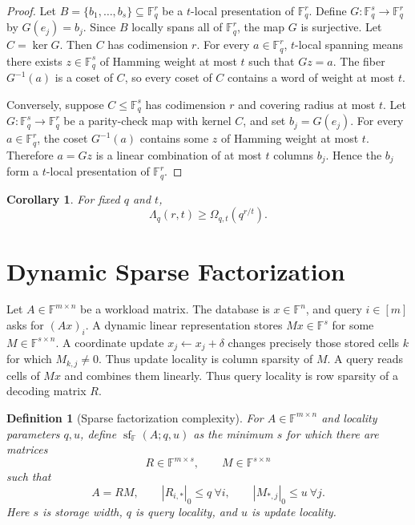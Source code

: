 \documentclass[11pt]{article}
\newtheorem{definition}[theorem]{Definition}
\newtheorem{corollary}[theorem]{Corollary}
\begin{document}
\begin{proof}
Let $B=\{b_1,\ldots,b_s\}\subseteq\mathbb F_q^r$ be a $t$-local presentation of $\mathbb F_q^r$. Define $G:\mathbb F_q^s\to\mathbb F_q^r$ by $G(e_j)=b_j$. Since $B$ locally spans all of $\mathbb F_q^r$, the map $G$ is surjective. Let $C=\ker G$. Then $C$ has codimension $r$. For every $a\in\mathbb F_q^r$, $t$-local spanning means there exists $z\in\mathbb F_q^s$ of Hamming weight at most $t$ such that $Gz=a$. The fiber $G^{-1}(a)$ is a coset of $C$, so every coset of $C$ contains a word of weight at most $t$.

Conversely, suppose $C\le\mathbb F_q^s$ has codimension $r$ and covering radius at most $t$. Let $G:\mathbb F_q^s\to\mathbb F_q^r$ be a parity-check map with kernel $C$, and set $b_j=G(e_j)$. For every $a\in\mathbb F_q^r$, the coset $G^{-1}(a)$ contains some $z$ of Hamming weight at most $t$. Therefore $a=Gz$ is a linear combination of at most $t$ columns $b_j$. Hence the $b_j$ form a $t$-local presentation of $\mathbb F_q^r$.
\end{proof}

\begin{corollary}
For fixed $q$ and $t$,
\[
\Lambda_q(r,t)\ge \Omega_{q,t}(q^{r/t}).
\]
\end{corollary}

\section{Dynamic Sparse Factorization}

Let $A\in\mathbb F^{m\times n}$ be a workload matrix. The database is $x\in\mathbb F^n$, and query $i\in[m]$ asks for $(Ax)_i$. A dynamic linear representation stores $Mx\in\mathbb F^s$ for some $M\in\mathbb F^{s\times n}$. A coordinate update $x_j\leftarrow x_j+\delta$ changes precisely those stored cells $k$ for which $M_{k,j}\ne 0$. Thus update locality is column sparsity of $M$. A query reads cells of $Mx$ and combines them linearly. Thus query locality is row sparsity of a decoding matrix $R$.

\begin{definition}[Sparse factorization complexity]
For $A\in\mathbb F^{m\times n}$ and locality parameters $q,u$, define $\operatorname{sf}_{\mathbb F}(A;q,u)$ as the minimum $s$ for which there are matrices
\[
R\in\mathbb F^{m\times s},
\qquad
M\in\mathbb F^{s\times n}
\]
such that
\[
A=RM,
\qquad
|R_{i,*}|_0\le q\ \forall i,
\qquad
|M_{*,j}|_0\le u\ \forall j.
\]
Here $s$ is storage width, $q$ is query locality, and $u$ is update locality.
\end{definition}
\end{document}
